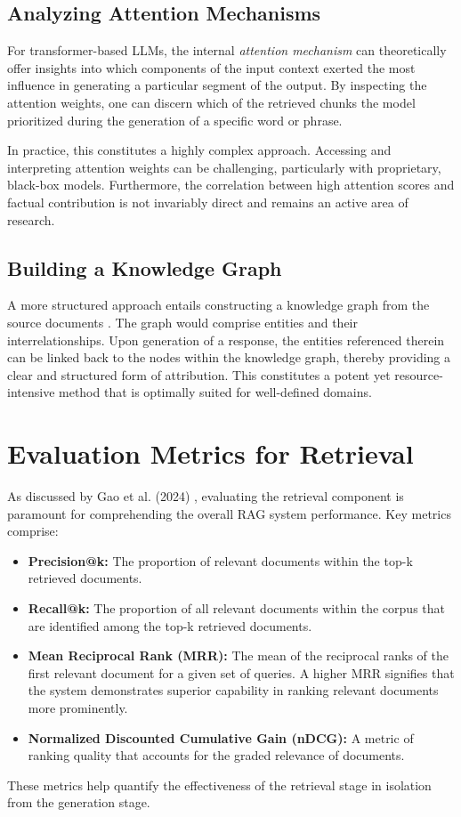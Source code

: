 \subsection{Analyzing Attention Mechanisms}
For transformer-based LLMs, the internal \textit{attention mechanism} can theoretically offer insights into which components of the input context exerted the most influence in generating a particular segment of the output. By inspecting the attention weights, one can discern which of the retrieved chunks the model prioritized during the generation of a specific word or phrase.

In practice, this constitutes a highly complex approach. Accessing and interpreting attention weights can be challenging, particularly with proprietary, black-box models. Furthermore, the correlation between high attention scores and factual contribution is not invariably direct and remains an active area of research.

\subsection{Building a Knowledge Graph}
A more structured approach entails constructing a knowledge graph from the source documents \autocite{gao2024retrievalaugmentedgenerationlargelanguage}. The graph would comprise entities and their interrelationships. Upon generation of a response, the entities referenced therein can be linked back to the nodes within the knowledge graph, thereby providing a clear and structured form of attribution. This constitutes a potent yet resource-intensive method that is optimally suited for well-defined domains.

\section{Evaluation Metrics for Retrieval}
As discussed by Gao et al. (2024) \autocite{gao2024retrievalaugmentedgenerationlargelanguage}, evaluating the retrieval component is paramount for comprehending the overall RAG system performance. Key metrics comprise:
\begin{itemize}
    \item \textbf{Precision@k:} The proportion of relevant documents within the top-k retrieved documents.
    \item \textbf{Recall@k:} The proportion of all relevant documents within the corpus that are identified among the top-k retrieved documents.
    \item \textbf{Mean Reciprocal Rank (MRR):} The mean of the reciprocal ranks of the first relevant document for a given set of queries. A higher MRR signifies that the system demonstrates superior capability in ranking relevant documents more prominently.
    \item \textbf{Normalized Discounted Cumulative Gain (nDCG):} A metric of ranking quality that accounts for the graded relevance of documents.
\end{itemize}
These metrics help quantify the effectiveness of the retrieval stage in isolation from the generation stage.
